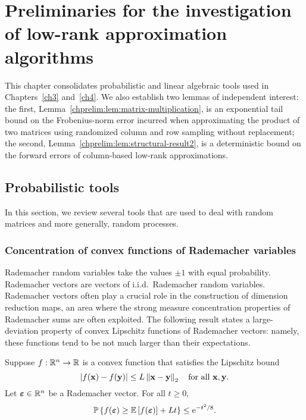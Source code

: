 
\chapter{Preliminaries for the investigation of low-rank approximation algorithms}
\label{chprelim}

This chapter consolidates probabilistic and 
linear algebraic tools used in Chapters~\ref{ch3} and~\ref{ch4}. We also establish 
two lemmas of independent interest: 
the first, Lemma~\ref{chprelim:lem:matrix-multiplication}, is an exponential tail bound on 
the Frobenius-norm error incurred when approximating the product of two 
matrices using randomized column and row sampling without replacement;
the second, Lemma~\ref{chprelim:lem:structural-result2}, is a deterministic bound on 
the forward errors of column-based low-rank approximations.

 \section{ Probabilistic tools}

 In this section, we review several tools that are used to deal with random 
 matrices and more generally, random processes.
 
\subsection{Concentration of convex functions of Rademacher variables}
Rademacher random variables take the values $\pm 1$ with equal
probability. Rademacher vectors are vectors of i.i.d.\ Rademacher random
variables. Rademacher vectors often play a crucial role in the construction of dimension reduction
maps, an area where the strong measure concentration properties of Rademacher
sums are often exploited. The following result states a large-deviation property of  
convex Lipschitz functions of Rademacher vectors:
namely, these functions tend to be not much larger than their expectations.

\begin{lemma}
\label{chprelim:lem:rademacher-concentration}
 Suppose $f : \mathbb{R}^n \rightarrow \mathbb{R}$ is a convex function that satisfies the Lipschitz 
 bound
\[
 |f({\mathbf x}) - f({\mathbf y})| \leq L \left\|{\mathbf x} - {\mathbf y}\right\|_2 \quad \text{for all ${\mathbf x}, {\mathbf y}$.}
\]
Let $\boldsymbol{\varepsilon} \in \mathbb{R}^n$ be a Rademacher vector. For all $t \geq 0,$
\[
 \mathbb{P}\left\{f(\boldsymbol{\varepsilon}) \geq \mbox{}{\mathbb{E}}\left[f(\boldsymbol{\varepsilon})\right] + Lt\right\} \leq 
 \mathrm{e}^{-t^2/8}.
\]
\end{lemma}
 
